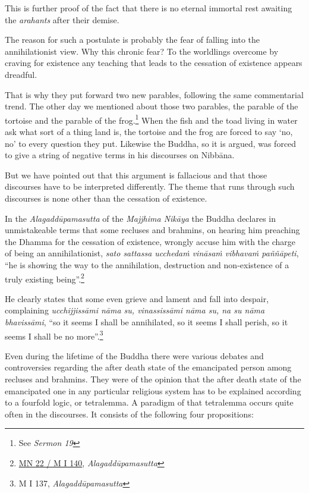 This is further proof of the fact that there is no eternal immortal rest awaiting the \emph{arahants} after their demise.

The reason for such a postulate is probably the fear of falling into the annihilationist view. Why this chronic fear? To the worldlings overcome by craving for existence any teaching that leads to the cessation of existence appears dreadful.

That is why they put forward two new parables, following the same commentarial trend. The other day we mentioned about those two parables, the parable of the tortoise and the parable of the frog.\footnote{See \emph{Sermon 19}} When the fish and the toad living in water ask what sort of a thing land is, the tortoise and the frog are forced to say `no, no' to every question they put. Likewise the Buddha, so it is argued, was forced to give a string of negative terms in his discourses on Nibbāna.

But we have pointed out that this argument is fallacious and that those discourses have to be interpreted differently. The theme that runs through such discourses is none other than the cessation of existence.

In the \emph{Alagaddūpamasutta} of the \emph{Majjhima Nikāya} the Buddha declares in unmistakeable terms that some recluses and brahmins, on hearing him preaching the Dhamma for the cessation of existence, wrongly accuse him with the charge of being an annihilationist, \emph{sato sattassa ucchedaṁ vināsaṁ vibhavaṁ paññāpeti}, ``he is showing the way to the annihilation, destruction and non-existence of a truly existing being''.\footnote{\href{https://suttacentral.net/mn22/pli/ms}{MN 22 / M I 140}, \emph{Alagaddūpamasutta}}

He clearly states that some even grieve and lament and fall into despair, complaining \emph{ucchijjissāmi nāma su, vinassissāmi nāma su, na su nāma bhavissāmi}, ``so it seems I shall be annihilated, so it seems I shall perish, so it seems I shall be no more''.\footnote{M I 137, \emph{Alagaddūpamasutta}}

Even during the lifetime of the Buddha there were various debates and controversies regarding the after death state of the emancipated person among recluses and brahmins. They were of the opinion that the after death state of the emancipated one in any particular religious system has to be explained according to a fourfold logic, or tetralemma. A paradigm of that tetralemma occurs quite often in the discourses. It consists of the following four propositions:

